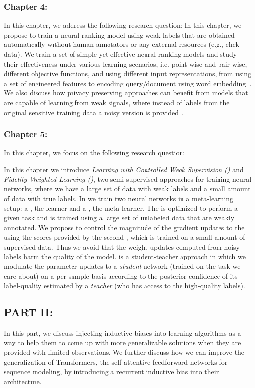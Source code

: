 \subsubsection*{Chapter 4: }
In this chapter, we address the following research question:
In this chapter, we propose to train a neural ranking model using weak labels that are obtained automatically without human annotators or any external resources (e.g., click data). We train a set of simple yet effective neural ranking models and study their effectiveness under various learning scenarios, i.e. point-wise and pair-wise, different objective functions, and using different input representations, from using a set of engineered features to encoding query/document using word embedding~\citep{Dehghani:2017:SIGIR}. We also discuss how privacy preserving approaches can benefit from models that are capable of learning from weak signals, where instead of labels from the original sensitive training data a noisy version is provided~\citep{dehghani:2017:neuir}.

\subsubsection*{Chapter 5: }
In this chapter, we focus on the following research question:

In this chapter we introduce \emph{Learning with Controlled Weak Supervision (\cws)} and \emph{Fidelity Weighted Learning (\fwl)}, two semi-supervised approaches for training neural networks, where we have a large set of data with weak labels and a small amount of data with true labels. 
%
In \cws we train two neural networks in a meta-learning setup: a \tnet, the learner and a \cnet, the meta-learner.  The \tnet is optimized to perform a given task and is trained using a large set of unlabeled data that are weakly annotated. We propose to control the magnitude of the gradient updates to the \tnet using the scores provided by the second \cnet, which is trained on a small amount of supervised data. Thus we avoid that the weight updates computed from noisy labels harm the quality of the \tnet model.
%
\fwl is a student-teacher approach in which we modulate the parameter updates to a \emph{student} network (trained on the task we care about) on a per-sample basis according to the posterior confidence of its label-quality estimated by a \emph{teacher} (who has access to the high-quality labels).  

\subsection*{PART II: }
In this part, we discuss injecting inductive biases into learning algorithms as a way to help them to come up with more generalizable solutions when they are provided with limited observations. We further discuss how we can improve the generalization of Transformers, the self-attentive feedforward networks for sequence modeling, by introducing a recurrent inductive bias into their architecture.

